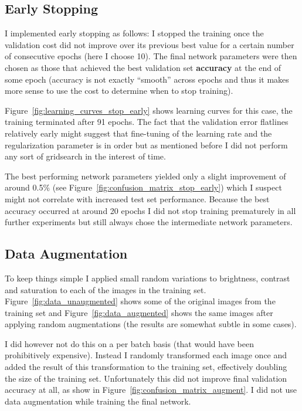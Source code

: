 \documentclass{article}
\begin{document}
\subsection{Early Stopping}
I implemented early stopping as follows: I stopped the training once the
validation cost did not improve over its previous best value for a certain
number of consecutive epochs (here I choose 10). The final network parameters
were then chosen as those that achieved the best validation set
\textbf{accuracy} at the end of some epoch (accuracy is not exactly ``smooth''
across epochs and thus it makes more sense to use the cost to determine when to
stop training).

Figure~\ref{fig:learning_curves_stop_early} shows learning curves for this
case, the training terminated after 91 epochs. The fact that the validation
error flatlines relatively early might suggest that fine-tuning of the learning
rate and the regularization parameter is in order but as mentioned before I
did not perform any sort of gridsearch in the interest of time.

The best performing network parameters yielded only a slight improvement of
around 0.5\% (see Figure~\ref{fig:confusion_matrix_stop_early}) which I suspect
might not correlate with increased test set performance. Because the best
accuracy occurred at around 20 epochs I did not stop training prematurely in all
further experiments but still always chose the intermediate network parameters.

\subsection{Data Augmentation}
To keep things simple I applied small random variations to brightness, contrast
and saturation to each of the images in the training set.
Figure~\ref{fig:data_unaugmented} shows some of the original images from the
training set and Figure~\ref{fig:data_augmented} shows the same images after
applying random augmentations (the results are somewhat subtle in some cases).

I did however not do this on a per batch basis (that would have been
prohibitively expensive). Instead I randomly transformed each image once and
added the result of this transformation to the training set, effectively
doubling the size of the training set. Unfortunately this did not improve final
validation accuracy at all, as show in
Figure~\ref{fig:confusion_matrix_augment}. I did not use data augmentation
while training the final network.
\end{document}
